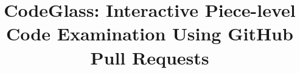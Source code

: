 \documentclass[conference]{IEEEtran}
\begin{document}
\title{CodeGlass: Interactive Piece-level Code Examination Using GitHub Pull Requests}



\maketitle



\IEEEpeerreviewmaketitle






























\end{document}
